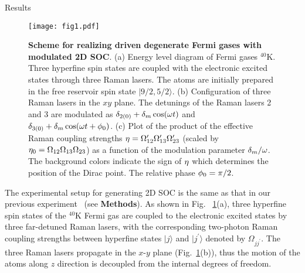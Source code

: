 \documentclass[aps,prl,twocolumn,floatfix,reprint]{revtex4}
\begin{document}
{\Large Results}

\begin{figure}[tbp]
\centerline{
\texttt{[image: fig1.pdf]}}
\caption{\textbf{Scheme for realizing driven degenerate Fermi gases with
modulated 2D SOC}. (a) Energy level diagram of Fermi gases $^{40}$K. Three
hyperfine spin states are coupled with the electronic excited states through
three Raman lasers. The atoms are initially prepared in the free reservoir
spin state $|9/2,5/2\rangle $. (b) Configuration of three Raman lasers in
the $xy$ plane. The detunings of the Raman lasers 2 and 3 are modulated as $%
\protect\delta _{2(0)}+\protect\delta _{m}\cos (\protect\omega t)$ and $%
\protect\delta _{3(0)}+\protect\delta _{m}\cos (\protect\omega t+\protect%
\phi _{0})$. (c) Plot of the product of the effective Raman coupling
strengths $\protect\eta =\Omega _{12}^{\prime }\Omega _{13}^{\prime }\Omega
_{23}^{\prime }$ (scaled by $\protect\eta _{0}=\Omega _{12}\Omega
_{13}\Omega _{23}$) as a function of the modulation parameter $\protect%
\delta _{m}/\protect\omega $. The background colors indicate the sign of $%
\protect\eta $ which determines the position of the Dirac point. The
relative phase $\protect\phi _{0}=\protect\pi /2$.}
\label{Fig1}
\end{figure}

The experimental setup for generating 2D SOC is the same as that in our
previous experiment~\cite{Huang15} (see \textbf{Methods}). As shown in Fig.~%
\ref{Fig1}(a), three hyperfine spin states of the $^{40}$K Fermi gas are
coupled to the electronic excited states by three far-detuned Raman lasers,
with the corresponding two-photon Raman coupling strengths between hyperfine
states $|j\rangle $ and $|j^{\prime }\rangle $ denoted by $\Omega
_{jj^{\prime }}$. The three Raman lasers propagate in the $x$-$y$ plane
(Fig.~\ref{Fig1}(b)), thus the motion of the atoms along $z$ direction is
decoupled from the internal degrees of freedom.
\end{document}
